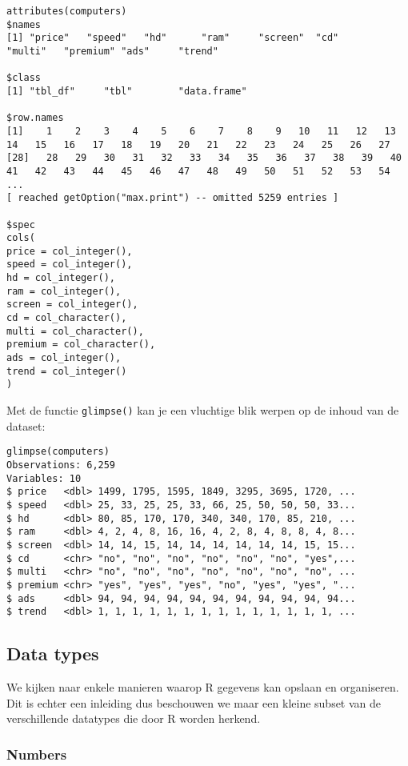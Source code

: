 \begin{lstlisting}[breaklines=true]
attributes(computers)
$names
[1] "price"   "speed"   "hd"      "ram"     "screen"  "cd"      "multi"   "premium" "ads"     "trend"  

$class
[1] "tbl_df"     "tbl"        "data.frame"

$row.names
[1]    1    2    3    4    5    6    7    8    9   10   11   12   13   14   15   16   17   18   19   20   21   22   23   24   25   26   27
[28]   28   29   30   31   32   33   34   35   36   37   38   39   40   41   42   43   44   45   46   47   48   49   50   51   52   53   54
...
[ reached getOption("max.print") -- omitted 5259 entries ]

$spec
cols(
price = col_integer(),
speed = col_integer(),
hd = col_integer(),
ram = col_integer(),
screen = col_integer(),
cd = col_character(),
multi = col_character(),
premium = col_character(),
ads = col_integer(),
trend = col_integer()
)

\end{lstlisting}

Met de functie \texttt{glimpse()} kan je een vluchtige blik werpen op de inhoud van de dataset:

\begin{lstlisting}
glimpse(computers)
Observations: 6,259
Variables: 10
$ price   <dbl> 1499, 1795, 1595, 1849, 3295, 3695, 1720, ...
$ speed   <dbl> 25, 33, 25, 25, 33, 66, 25, 50, 50, 50, 33...
$ hd      <dbl> 80, 85, 170, 170, 340, 340, 170, 85, 210, ...
$ ram     <dbl> 4, 2, 4, 8, 16, 16, 4, 2, 8, 4, 8, 8, 4, 8...
$ screen  <dbl> 14, 14, 15, 14, 14, 14, 14, 14, 14, 15, 15...
$ cd      <chr> "no", "no", "no", "no", "no", "no", "yes",...
$ multi   <chr> "no", "no", "no", "no", "no", "no", "no", ...
$ premium <chr> "yes", "yes", "yes", "no", "yes", "yes", "...
$ ads     <dbl> 94, 94, 94, 94, 94, 94, 94, 94, 94, 94, 94...
$ trend   <dbl> 1, 1, 1, 1, 1, 1, 1, 1, 1, 1, 1, 1, 1, 1, ...
\end{lstlisting}

\subsection{Data types}

We kijken naar enkele manieren waarop R gegevens kan opslaan en organiseren. Dit is echter een inleiding dus beschouwen we maar een kleine subset van de verschillende datatypes die door R worden herkend. 

\subsubsection{Numbers}

